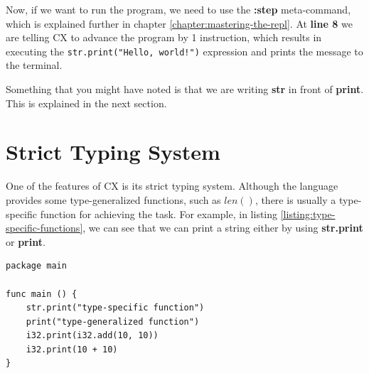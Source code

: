 \documentclass[11pt,fleqn,openany]{book} %
\begin{document}
Now, if we want to run the program, we need to use the \textbf{:step} meta-command, which is explained further in chapter \ref{chapter:mastering-the-repl}. At \textbf{line 8} we are telling CX to advance the program by 1 instruction, which results in executing the \lstinline{str.print("Hello, world!")} expression and prints the message to the terminal.

Something that you might have noted is that we are writing \textbf{str} in front of \textbf{print}. This is explained in the next section.

\section{Strict Typing System}


One of the features of CX is its strict typing system. Although the language provides some type-generalized functions, such as $len()$, there is usually a type-specific function for achieving the task. For example, in listing \ref{listing:type-specific-functions}, we can see that we can print a string either by using \textbf{str.print} or \textbf{print}.

\begin{lstlisting}[caption={Type-specific functions},captionpos=b,label={listing:type-specific-functions}]
package main

func main () {
 	str.print("type-specific function")
    print("type-generalized function")
    i32.print(i32.add(10, 10))
    i32.print(10 + 10)
}
\end{lstlisting}
\end{document}
